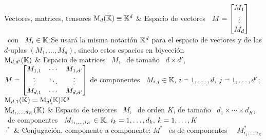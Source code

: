 \begin{notation}{Vectores, matrices, tensores}
%
$\mathrm{M}_d(\mathbb{K}) \equiv \mathbb{K}^d$
 & Espacio de vectores \ $M = \protect\begin{bmatrix} M_1\\ \vdots\\ M_d
\protect\end{bmatrix}$ \ con \ $M_i \in \mathbb{K}$;\vspace{1mm}\newline Se usar\'a
la misma notaci\'on $\mathbb{K}^d$ para el espacio de vectores y de las $d$-uplas $(M_1 ,
\ldots , M_d)$, sinedo estos espacios en biyecci\'on\\[2.5mm]
\hline
%
$\mathrm{M}_{d,d'}(\mathbb{K})$ & Espacio de matrices \ $M$, \ de tama\~no \ $d \times d'$,
\ $M = \protect\begin{bmatrix} M_{1,1} & \cdots & M_{1,d'}\\ \vdots & \ddots &
\vdots\\ M_{d,1} & \cdots & M_{d,d'} \protect\end{bmatrix}$ de componentes \
$M_{i,j} \in \mathbb{K}, \: i = 1, \ldots , d, \: j = 1 , \ldots ,
d'$;\vspace{1mm}\newline $\mathrm{M}_{d,1}(\mathbb{K}) = \mathrm{M}_d(\mathbb{K}) \mathbb{K}^d$\\[2.5mm]
\hline
%
$\mathrm{M}_{d_1 ,  \ldots , d_K}(\mathbb{K})$  & Espacio de tensores
 \ $M$, \ de orden $K$, de tama\~no \ $d_1 \times \cdots \times d_K$, \ de
componentes \ $M_{i_1,\ldots,i_K} \in \mathbb{K}, \: i_k = 1 , \ldots , d_k, \: k = 1
, \ldots , K$\\[2.5mm]
\hline
%
$\cdot^*$ & Conjugaci\'on, componente a componente: $M^*$ \ es de componentes \
 \ $M_{i_1,\ldots,i_K}^*$\\[2.5mm]

\end{notation}
